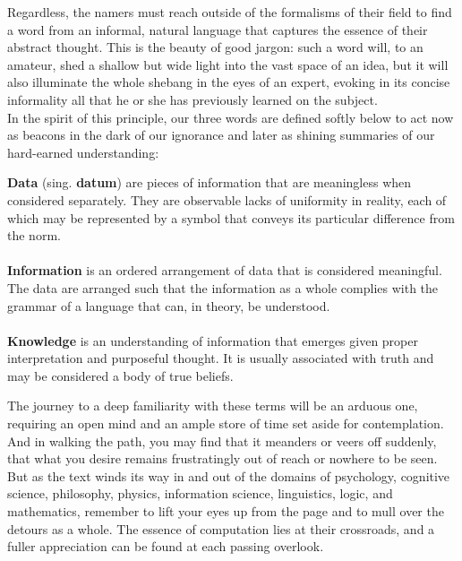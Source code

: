 Regardless, the namers must reach outside of the formalisms of their field to find a word from an informal, natural language that captures the essence of their abstract thought. This is the beauty of good jargon: such a word will, to an amateur, shed a shallow but wide light into the vast space of an idea, but it will also illuminate the whole shebang in the eyes of an expert, evoking in its concise informality all that he or she has previously learned on the subject. \\

In the spirit of this principle, our three words are defined softly below to act now as beacons in the dark of our ignorance and later as shining summaries of our hard-earned understanding: \\

\begin{displayquote}
	\textbf{Data} (sing. \textbf{datum}) are pieces of information that are meaningless when considered separately. They are observable lacks of uniformity in reality, each of which may be represented by a symbol that conveys its particular difference from the norm. \\~\\
	\textbf{Information} is an ordered arrangement of data that is considered meaningful. The data are arranged such that the information as a whole complies with the grammar of a language that can, in theory, be understood. \\~\\
	\textbf{Knowledge} is an understanding of information that emerges given proper interpretation and purposeful thought. It is usually associated with truth and may be considered a body of true beliefs. \\
\end{displayquote}

The journey to a deep familiarity with these terms will be an arduous one, requiring an open mind and an ample store of time set aside for contemplation. And in walking the path, you may find that it meanders or veers off suddenly, that what you desire remains frustratingly out of reach or nowhere to be seen. But as the text winds its way in and out of the domains of psychology, cognitive science, philosophy, physics, information science, linguistics, logic, and mathematics, remember to lift your eyes up from the page and to mull over the detours as a whole. The essence of computation lies at their crossroads, and a fuller appreciation can be found at each passing overlook. \\

